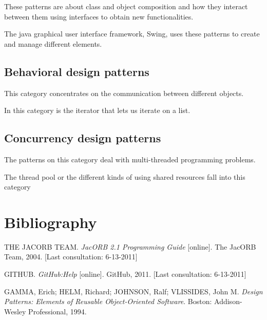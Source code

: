 These patterns are about class and object composition and how they interact between them using interfaces to obtain new functionalities.

The java graphical user interface framework, Swing, uses these patterns to create and manage different elements.


\subsection*{Behavioral design patterns}

This category concentrates on the communication between different objects.

In this category is the iterator that lets us iterate on a list.


\subsection*{Concurrency design patterns}

The patterns on this category deal with multi-threaded programming problems.

The thread pool or the different kinds of using shared resources fall into this category

\section{Bibliography}

\noindent THE JACORB TEAM. \textit{JacORB 2.1 Programming Guide} [online]. The JacORB Team, 2004. \newline {} [Last consultation: 6-13-2011]
\bigskip

\noindent GITHUB. \textit{GitHub:Help} [online]. GitHub, 2011. \newline {} [Last consultation: 6-13-2011]
\bigskip

\noindent GAMMA, Erich; HELM, Richard; JOHNSON, Ralf; VLISSIDES, John M. \textit{Design Patterns: Elements of Reusable Object-Oriented Software}. Boston: Addison-Wesley Professional, 1994. \newline 
\bigskip

